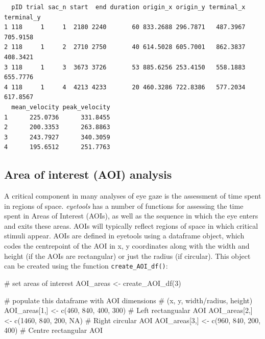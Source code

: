 \documentclass[
  man,
  floatsintext,
  longtable,
  nolmodern,
  notxfonts,
  notimes,
  colorlinks=true,linkcolor=blue,citecolor=blue,urlcolor=blue]{apa7}
\newenvironment{Shaded}{\begin{snugshade}}{\end{snugshade}}
\newcommand{\CommentTok}[1]{\textcolor[rgb]{0.37,0.37,0.37}{#1}}
\newcommand{\ConstantTok}[1]{\textcolor[rgb]{0.56,0.35,0.01}{#1}}
\newcommand{\DecValTok}[1]{\textcolor[rgb]{0.68,0.00,0.00}{#1}}
\newcommand{\FunctionTok}[1]{\textcolor[rgb]{0.28,0.35,0.67}{#1}}
\newcommand{\NormalTok}[1]{\textcolor[rgb]{0.00,0.23,0.31}{#1}}
\newcommand{\OtherTok}[1]{\textcolor[rgb]{0.00,0.23,0.31}{#1}}
\begin{document}
\begin{verbatim}
  pID trial sac_n start  end duration origin_x origin_y terminal_x terminal_y
1 118     1     1  2180 2240       60 833.2688 296.7871   487.3967   705.9158
2 118     1     2  2710 2750       40 614.5028 605.7001   862.3837   408.3421
3 118     1     3  3673 3726       53 885.6256 253.4150   558.1883   655.7776
4 118     1     4  4213 4233       20 460.3286 722.8386   577.2034   617.8567
  mean_velocity peak_velocity
1      225.0736      331.8455
2      200.3353      263.8863
3      243.7927      340.3059
4      195.6512      251.7763
\end{verbatim}

\subsection{Area of interest (AOI)
analysis}\label{area-of-interest-aoi-analysis}

A critical component in many analyses of eye gaze is the assessment of
time spent in regions of space. \emph{eyetools} has a number of
functions for assessing the time spent in Areas of Interest (AOIs), as
well as the sequence in which the eye enters and exits these areas. AOIs
will typically reflect regions of space in which critical stimuli
appear. AOIs are defined in eyetools using a dataframe object, which
codes the centrepoint of the AOI in x, y coordinates along with the
width and height (if the AOIs are rectangular) or just the radius (if
circular). This object can be created using the function
\texttt{create\_AOI\_df()}:

\begin{Shaded}
\begin{Highlighting}[]
\CommentTok{\# set areas of interest}
\NormalTok{AOI\_areas }\OtherTok{\textless{}{-}} \FunctionTok{create\_AOI\_df}\NormalTok{(}\DecValTok{3}\NormalTok{)}

\CommentTok{\# populate this dataframe with AOI dimensions }
\CommentTok{\# (x, y, width/radius, height)}
\NormalTok{AOI\_areas[}\DecValTok{1}\NormalTok{,] }\OtherTok{\textless{}{-}} \FunctionTok{c}\NormalTok{(}\DecValTok{460}\NormalTok{, }\DecValTok{840}\NormalTok{, }\DecValTok{400}\NormalTok{, }\DecValTok{300}\NormalTok{) }\CommentTok{\# Left rectangualar AOI}
\NormalTok{AOI\_areas[}\DecValTok{2}\NormalTok{,] }\OtherTok{\textless{}{-}} \FunctionTok{c}\NormalTok{(}\DecValTok{1460}\NormalTok{, }\DecValTok{840}\NormalTok{, }\DecValTok{200}\NormalTok{, }\ConstantTok{NA}\NormalTok{) }\CommentTok{\# Right circular AOI}
\NormalTok{AOI\_areas[}\DecValTok{3}\NormalTok{,] }\OtherTok{\textless{}{-}} \FunctionTok{c}\NormalTok{(}\DecValTok{960}\NormalTok{, }\DecValTok{840}\NormalTok{, }\DecValTok{200}\NormalTok{, }\DecValTok{400}\NormalTok{) }\CommentTok{\# Centre rectangular AOI}
\end{Highlighting}
\end{Shaded}
\end{document}
